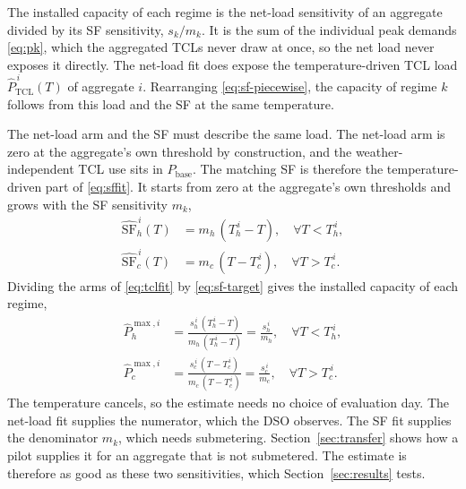 The installed capacity of each regime is the net-load sensitivity of an aggregate divided by its SF sensitivity, $s_k/m_k$. It is the sum of the individual peak demands \eqref{eq:pk}, which the aggregated TCLs never draw at once, so the net load never exposes it directly. The net-load fit does expose the temperature-driven TCL load $\hat{P}_{\mathrm{TCL}}^{\,i}(T)$ of aggregate $i$. Rearranging \eqref{eq:sf-piecewise}, the capacity of regime $k$ follows from this load and the SF at the same temperature.

The net-load arm and the SF must describe the same load. The net-load arm is zero at the aggregate's own threshold by construction, and the weather-independent TCL use sits in $P_{\mathrm{base}}$. The matching SF is therefore the temperature-driven part of \eqref{eq:sffit}. It starts from zero at the aggregate's own thresholds and grows with the SF sensitivity $m_k$,
\begin{equation}
\begin{aligned}
    \hat{\mathrm{SF}}_h^{\,i}(T) &= m_h\,(T_h^{\,i} - T), \quad \forall T < T_h^{\,i},\\
    \hat{\mathrm{SF}}_c^{\,i}(T) &= m_c\,(T - T_c^{\,i}), \quad \forall T > T_c^{\,i}.
\end{aligned}
\label{eq:sf-target}
\end{equation}
Dividing the arms of \eqref{eq:tclfit} by \eqref{eq:sf-target} gives the installed capacity of each regime,
\begin{equation}
\begin{aligned}
    \hat{P}_h^{\max,i} &= \frac{s_h^{\,i}\,(T_h^{\,i} - T)}{m_h\,(T_h^{\,i} - T)} = \frac{s_h^{\,i}}{m_h}, \quad \forall T < T_h^{\,i},\\
    \hat{P}_c^{\max,i} &= \frac{s_c^{\,i}\,(T - T_c^{\,i})}{m_c\,(T - T_c^{\,i})} = \frac{s_c^{\,i}}{m_c}, \quad \forall T > T_c^{\,i}.
\end{aligned}
\label{eq:capacity}
\end{equation}
The temperature cancels, so the estimate needs no choice of evaluation day. The net-load fit supplies the numerator, which the DSO observes. The SF fit supplies the denominator $m_k$, which needs submetering. Section~\ref{sec:transfer} shows how a pilot supplies it for an aggregate that is not submetered. The estimate is therefore as good as these two sensitivities, which Section~\ref{sec:results} tests.

